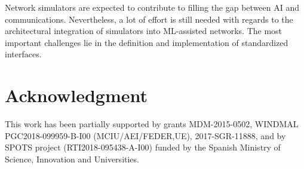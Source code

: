 \documentclass[journal]{IEEEtran}
\begin{document}
	Network simulators are expected to contribute to filling the gap between AI and communications. Nevertheless, a lot of effort is still needed with regards to the architectural integration of simulators into ML-assisted networks. The most important challenges lie in the definition and implementation of standardized interfaces.

	\section*{Acknowledgment}
	This work has been partially supported by grants MDM-2015-0502, WINDMAL PGC2018-099959-B-I00 (MCIU/AEI/FEDER,UE), 2017-SGR-11888, and by SPOTS project (RTI2018-095438-A-I00) funded by the Spanish Ministry of Science, Innovation and Universities.
	
	\ifCLASSOPTIONcaptionsoff
	\newpage
	\fi
	
\end{document}
